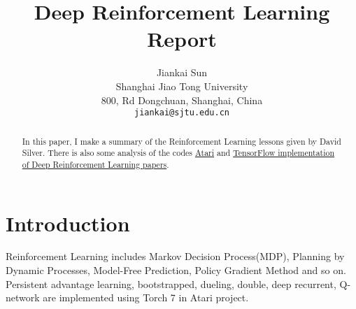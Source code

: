 \documentclass[10pt,twocolumn,letterpaper]{article}
\begin{document}
	
	\title{Deep Reinforcement Learning Report}
	
	\author{Jiankai Sun\\
		Shanghai Jiao Tong University\\
		800, Rd Dongchuan, Shanghai, China\\
		{\tt\small jiankai@sjtu.edu.cn}
	}
	
	\maketitle
	
	\begin{abstract}
		In this paper, I make a summary of the Reinforcement Learning lessons given by David Silver. There is also some analysis of the codes \href{https://github.com/Kaixhin/Atari}{Atari} and \href{https://github.com/carpedm20/deep-rl-tensorflow}{TensorFlow implementation of Deep Reinforcement Learning papers}. 
	\end{abstract}
	
	\section{Introduction}
	
	Reinforcement Learning includes Markov Decision Process(MDP), Planning by Dynamic Processes, Model-Free Prediction, Policy Gradient Method and so on. Persistent advantage learning, bootstrapped, dueling, double, deep recurrent, Q-network are implemented using Torch 7 in Atari project.
	
\end{document}
